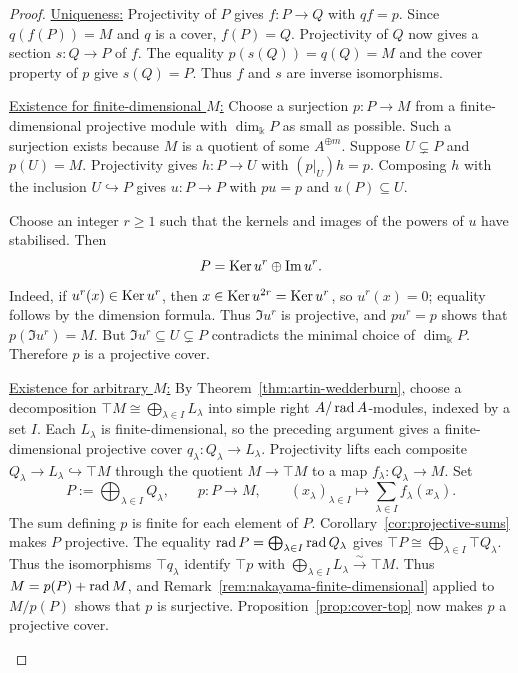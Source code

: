 \begin{proof}
\underline{Uniqueness:}
Projectivity of $P$ gives $f:P\to Q$ with $qf=p$.
Since $q(f(P))=M$ and $q$ is a cover, $f(P)=Q$.
Projectivity of $Q$ now gives a section $s:Q\to P$ of $f$.
The equality $p(s(Q))=q(Q)=M$ and the cover property of $p$ give $s(Q)=P$.
Thus $f$ and $s$ are inverse isomorphisms.

\begin{supplementary}
\underline{Existence for finite-dimensional $M$:}
Choose a surjection $p:P\to M$ from a finite-dimensional projective module with $\dim_\Bbbk P$ as small as possible.
Such a surjection exists because $M$ is a quotient of some $A^{\oplus m}$.
Suppose $U\subsetneq P$ and $p(U)=M$.
Projectivity gives $h:P\to U$ with $(p|_U)h=p$.
Composing $h$ with the inclusion $U\hookrightarrow P$ gives $u:P\to P$ with $pu=p$ and $u(P)\subseteq U$.

Choose an integer $r\geq1$ such that the kernels and images of the powers of $u$ have stabilised.
Then
\[
P=\operatorname{Ker}\nolimits u^r\oplus\operatorname{Im}\nolimits u^r.
\]
Indeed, if $u^r(x)\in\operatorname{Ker}\nolimits u^r$, then $x\in\operatorname{Ker}\nolimits u^{2r}=\operatorname{Ker}\nolimits u^r$, so $u^r(x)=0$; equality follows by the dimension formula.
Thus $\Im u^r$ is projective, and $pu^r=p$ shows that $p(\Im u^r)=M$.
But $\Im u^r\subseteq U\subsetneq P$ contradicts the minimal choice of $\dim_\Bbbk P$.
Therefore $p$ is a projective cover.

\underline{Existence for arbitrary $M$:}
By Theorem~\ref{thm:artin-wedderburn}, choose a decomposition
$\top M\cong\bigoplus_{\lambda\in I}L_\lambda$ into simple right $A/\operatorname{rad}\nolimits A$-modules, indexed by a set $I$.
Each $L_\lambda$ is finite-dimensional, so the preceding argument gives a finite-dimensional projective cover $q_\lambda:Q_\lambda\to L_\lambda$.
Projectivity lifts each composite $Q_\lambda\to L_\lambda\hookrightarrow\top M$ through the quotient $M\to\top M$ to a map $f_\lambda:Q_\lambda\to M$.
Set
\[
P:=\bigoplus_{\lambda\in I}Q_\lambda,\qquad
p:P\longrightarrow M,\qquad
(x_\lambda)_{\lambda\in I}\longmapsto\sum_{\lambda\in I}f_\lambda(x_\lambda).
\]
The sum defining $p$ is finite for each element of $P$.
Corollary~\ref{cor:projective-sums} makes $P$ projective.
The equality $\operatorname{rad}\nolimits P=\bigoplus_{\lambda\in I}\operatorname{rad}\nolimits Q_\lambda$ gives $\top P\cong\bigoplus_{\lambda\in I}\top Q_\lambda$.
Thus the isomorphisms $\top q_\lambda$ identify $\top p$ with
$\bigoplus_{\lambda\in I}L_\lambda\xrightarrow{\sim}\top M$.
Thus $M=p(P)+\operatorname{rad}\nolimits M$, and Remark~\ref{rem:nakayama-finite-dimensional} applied to $M/p(P)$ shows that $p$ is surjective.
Proposition~\ref{prop:cover-top} now makes $p$ a projective cover.
\end{supplementary}
\end{proof}

